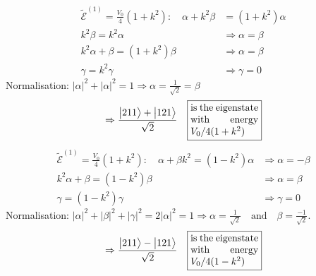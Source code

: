 \documentclass[12pt,fancychapters]{report}
\numberwithin{equation}{section}
\begin{document}
\begin{align*}
  \tilde{\mathcal{E}}^{(1)}= \frac{V_0}{4}\left(1+k^2\right): \quad 
  \alpha +k^2\beta &= \left(1+k^2\right)\alpha\\
  k^2\beta = k^2\alpha &\Rightarrow \alpha=\beta\\
  k^2\alpha+\beta =\left(1+k^2\right)\beta& \Rightarrow \alpha = \beta\\
  \gamma = k^2\gamma &\Rightarrow \gamma = 0
\end{align*}
Normalisation: $\big|\alpha\big|^2 + \big|\alpha\big|^2 = 1 \Rightarrow \alpha = \frac{1}{
\sqrt{2}} = \beta$
\[
  \Rightarrow \frac{\big|211\big>+\big|121\big>}{\sqrt{2}}\quad \fbox{%
  \parbox{.2\textwidth}{%
  is the eigenstate with energy $V_0/4 (1+k^2)$}%
} 
\]
\begin{align*}
  \tilde{\mathcal{E}}^{(1)} = \frac{V_0}{4}\left(1+k^2\right):\quad \alpha +\beta k^2 = 
  \left(1-k^2\right)\alpha &\Rightarrow \alpha = -\beta\\
  k^2\alpha +\beta  = \left(1-k^2\right)\beta &\Rightarrow \alpha = \beta\\
  \gamma = \left(1-k^2\right)\gamma &\Rightarrow \gamma = 0
\end{align*}
\newpage
\clearpage
Normalisation: $\big|\alpha\big|^2 + \big|\beta\big|^2+\big|\gamma\big|^2 = 2\big|\alpha\big|^2=
1 \Rightarrow \alpha = \frac{1}{\sqrt{2}}\quad \text{and}\quad \beta=\frac{-1}{\sqrt{2}}$.\\
\[
  \Rightarrow \frac{\big|211\big>-\big|121\big>}{\sqrt{2}}\quad \fbox{%
  \parbox{.2\textwidth}{%
  is the eigenstate with energy $V_0/4 (1-k^2)$}%
} 
\]
\end{document}
